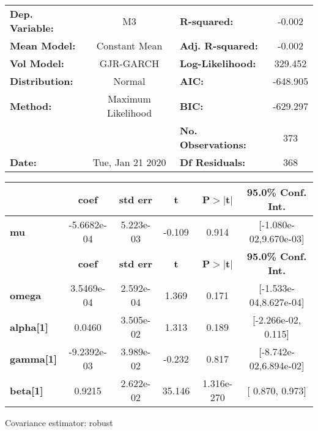 \begin{center}
\begin{tabular}{lclc}
\toprule
\textbf{Dep. Variable:} &         M3         & \textbf{  R-squared:         } &    -0.002   \\
\textbf{Mean Model:}    &   Constant Mean    & \textbf{  Adj. R-squared:    } &    -0.002   \\
\textbf{Vol Model:}     &     GJR-GARCH      & \textbf{  Log-Likelihood:    } &    329.452  \\
\textbf{Distribution:}  &       Normal       & \textbf{  AIC:               } &   -648.905  \\
\textbf{Method:}        & Maximum Likelihood & \textbf{  BIC:               } &   -629.297  \\
\textbf{}               &                    & \textbf{  No. Observations:  } &    373      \\
\textbf{Date:}          &  Tue, Jan 21 2020  & \textbf{  Df Residuals:      } &    368      \\
\bottomrule
\end{tabular}
\begin{tabular}{lccccc}
            & \textbf{coef} & \textbf{std err} & \textbf{t} & \textbf{P$>$$|$t$|$} & \textbf{95.0\% Conf. Int.}  \\
\midrule
\textbf{mu} &  -5.6682e-04  &    5.223e-03     &    -0.109  &          0.914       &   [-1.080e-02,9.670e-03]    \\
                  & \textbf{coef} & \textbf{std err} & \textbf{t} & \textbf{P$>$$|$t$|$} & \textbf{95.0\% Conf. Int.}  \\
\midrule
\textbf{omega}    &   3.5469e-04  &    2.592e-04     &     1.369  &          0.171       &   [-1.533e-04,8.627e-04]    \\
\textbf{alpha[1]} &       0.0460  &    3.505e-02     &     1.313  &          0.189       &    [-2.266e-02,  0.115]     \\
\textbf{gamma[1]} &  -9.2392e-03  &    3.989e-02     &    -0.232  &          0.817       &   [-8.742e-02,6.894e-02]    \\
\textbf{beta[1]}  &       0.9215  &    2.622e-02     &    35.146  &      1.316e-270      &     [  0.870,  0.973]       \\
\bottomrule
\end{tabular}
\end{center}

Covariance estimator: robust
